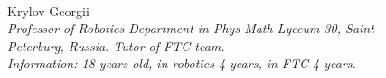 \begin{figure}[H]
\begin{minipage}[h]{0.47\linewidth}
		\\
	\end{minipage}
	\hfill
	\begin{minipage}{0.47\linewidth}
		Krylov Georgii \\ 
		\emph{Professor of Robotics Department in Phys-Math Lyceum 30, Saint-Peterburg, Russia. Tutor of FTC team. \\}
		\emph{Information: 18 years old, in robotics 4 years, in FTC 4 years.}
	\end{minipage}	
\end{figure}

\fillpage

